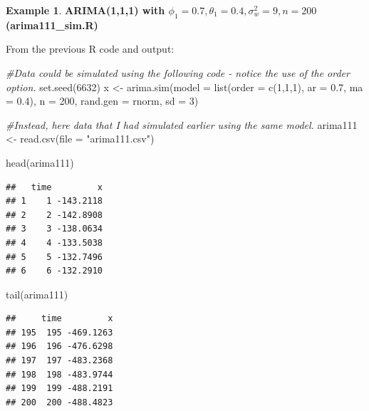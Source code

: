 \documentclass[
]{book}
\newenvironment{Shaded}{\begin{snugshade}}{\end{snugshade}}
\newcommand{\AttributeTok}[1]{\textcolor[rgb]{0.77,0.63,0.00}{#1}}
\newcommand{\CommentTok}[1]{\textcolor[rgb]{0.56,0.35,0.01}{\textit{#1}}}
\newcommand{\DecValTok}[1]{\textcolor[rgb]{0.00,0.00,0.81}{#1}}
\newcommand{\FloatTok}[1]{\textcolor[rgb]{0.00,0.00,0.81}{#1}}
\newcommand{\FunctionTok}[1]{\textcolor[rgb]{0.00,0.00,0.00}{#1}}
\newcommand{\NormalTok}[1]{#1}
\newcommand{\OtherTok}[1]{\textcolor[rgb]{0.56,0.35,0.01}{#1}}
\newcommand{\StringTok}[1]{\textcolor[rgb]{0.31,0.60,0.02}{#1}}
\theoremstyle{definition}
\theoremstyle{definition}
\newtheorem{example}{Example}[chapter]
\theoremstyle{definition}
\theoremstyle{definition}
\theoremstyle{remark}
\begin{document}
\begin{example}
\textbf{ARIMA(1,1,1) with \(\phi_1=0.7, \theta_1=0.4, \sigma_w^2=9, n=200\) (arima111\_sim.R)}

From the previous R code and output:

\begin{Shaded}
\begin{Highlighting}[]
\CommentTok{\#Data could be simulated using the following code {-} notice the use of the order option.  }
\FunctionTok{set.seed}\NormalTok{(}\DecValTok{6632}\NormalTok{)}
\NormalTok{x }\OtherTok{\textless{}{-}} \FunctionTok{arima.sim}\NormalTok{(}\AttributeTok{model =} \FunctionTok{list}\NormalTok{(}\AttributeTok{order =} \FunctionTok{c}\NormalTok{(}\DecValTok{1}\NormalTok{,}\DecValTok{1}\NormalTok{,}\DecValTok{1}\NormalTok{), }\AttributeTok{ar =} \FloatTok{0.7}\NormalTok{, }\AttributeTok{ma =} \FloatTok{0.4}\NormalTok{), }\AttributeTok{n =} \DecValTok{200}\NormalTok{, }\AttributeTok{rand.gen =}\NormalTok{ rnorm, }\AttributeTok{sd =} \DecValTok{3}\NormalTok{)}
\end{Highlighting}
\end{Shaded}

\begin{Shaded}
\begin{Highlighting}[]
\CommentTok{\#Instead, here data that I had simulated earlier using the same model.  }
\NormalTok{  arima111 }\OtherTok{\textless{}{-}} \FunctionTok{read.csv}\NormalTok{(}\AttributeTok{file =} \StringTok{"arima111.csv"}\NormalTok{)}

  \FunctionTok{head}\NormalTok{(arima111)}
\end{Highlighting}
\end{Shaded}

\begin{verbatim}
##   time         x
## 1    1 -143.2118
## 2    2 -142.8908
## 3    3 -138.0634
## 4    4 -133.5038
## 5    5 -132.7496
## 6    6 -132.2910
\end{verbatim}

\begin{Shaded}
\begin{Highlighting}[]
  \FunctionTok{tail}\NormalTok{(arima111)}
\end{Highlighting}
\end{Shaded}

\begin{verbatim}
##     time         x
## 195  195 -469.1263
## 196  196 -476.6298
## 197  197 -483.2368
## 198  198 -483.9744
## 199  199 -488.2191
## 200  200 -488.4823
\end{verbatim}


\end{example}
\end{document}
